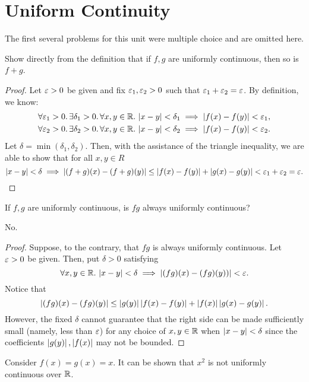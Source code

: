 \section{Uniform Continuity}

\begin{callout}
  The first several problems for this unit were multiple choice
  and are omitted here.
\end{callout}

\begin{problem}
  Show directly from the definition that if $f, g$ are uniformly continuous,
  then so is $f+g$.

  \begin{proof}
    Let $\varepsilon > 0$ be given and fix $\varepsilon_{1}, \varepsilon_{2} > 0$ such that
    $\varepsilon_{1} + \varepsilon_{2} = \varepsilon$. By definition, 
    we know:
    \begin{align*}
      \forall \varepsilon_{1} > 0.\, \exists \delta_{1} > 0.\, \forall x, y \in \mathbb{R}.\, \left\lvert x - y \right\rvert < \delta_{1} \implies \left\lvert f(x) - f(y) \right\rvert < \varepsilon_{1},\\
      \forall \varepsilon_{2} > 0.\, \exists \delta_{2} > 0.\, \forall x, y \in \mathbb{R}.\, \left\lvert x - y \right\rvert < \delta_{2} \implies \left\lvert f(x) - f(y) \right\rvert < \varepsilon_{2}.
    \end{align*}
    Let $\delta = \min{(\delta_{1}, \delta_{2})}$. Then, with the assistance
    of the triangle inequality, we are able to show that for all $x, y \in R$
    \[
      \left\lvert x - y \right\rvert < \delta \implies \left\lvert (f+g)(x) - (f+g)(y) \right\rvert \leq \left\lvert f(x) - f(y) \right\rvert + \left\lvert g(x) - g(y) \right\rvert < \varepsilon_{1} + \varepsilon_{2} = \varepsilon.
    \]
  \end{proof}
\end{problem}

\begin{problem}
  If $f, g$ are uniformly continuous, is $fg$ always uniformly continuous?
  \vspace{\baselineskip}

  No.

  \begin{proof}
    Suppose, to the contrary, that $fg$ is always uniformly continuous. 
    Let $\varepsilon > 0$ be given. Then, put $\delta > 0$ satisfying 
    \[
      \forall x, y \in \mathbb{R}.\, \left\lvert x - y \right\rvert < \delta \implies \left\lvert (fg)(x) - (fg)(y)) \right\rvert < \varepsilon.
    \]
    Notice that
    \[
      \left\lvert (fg)(x) - (fg)(y) \right\rvert \leq \left\lvert g(y) \right\rvert\left\lvert f(x)- f(y) \right\rvert + \left\lvert f(x) \right\rvert\left\lvert g(x)- g(y) \right\rvert.
    \]
    However, the fixed $\delta$ cannot guarantee that the right side can be made sufficiently small
    (namely, less than $\varepsilon$) for any choice of $x, y \in \mathbb{R}$ when $\left\lvert x -  y \right\rvert < \delta$ since
    the coefficients $\left\lvert g(y) \right\rvert, \left\lvert f(x) \right\rvert$ may not be bounded.
  \end{proof}

  Consider $f(x) = g(x) = x$. It can be shown that $x^{2}$ is not uniformly continuous over $\mathbb{R}$.

\end{problem}

